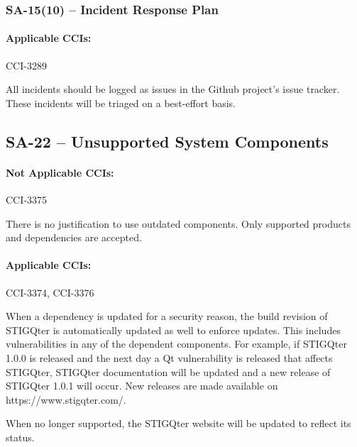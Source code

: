 \documentclass[letterpaper, 10pt, twoside]{article}
\begin{document}
\subsubsection{SA-15(10) -- Incident Response Plan}

\paragraph{Applicable CCIs:} CCI-3289

All incidents should be logged as issues in the Github project's issue tracker. These incidents will be triaged on a best-effort basis.

\subsection{SA-22 -- Unsupported System Components}

\paragraph{Not Applicable CCIs:} CCI-3375

There is no justification to use outdated components. Only supported products and dependencies are accepted.

\paragraph{Applicable CCIs:} CCI-3374, CCI-3376

When a dependency is updated for a security reason, the build revision of STIGQter is automatically updated as well to enforce updates. This includes vulnerabilities in any of the dependent components. For example, if STIGQter 1.0.0 is released and the next day a Qt vulnerability is released that affects STIGQter, STIGQter documentation will be updated and a new release of STIGQter 1.0.1 will occur. New releases are made available on https://www.stigqter.com/.

When no longer supported, the STIGQter website will be updated to reflect its status.

\clearpage
\printbibliography
\end{document}
